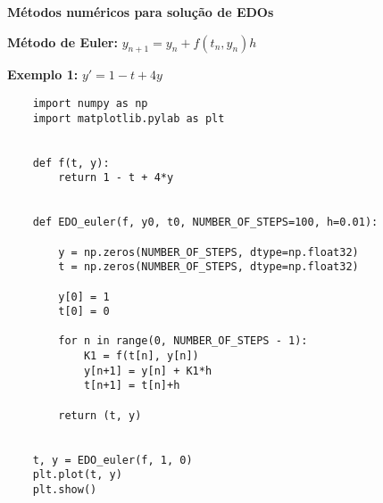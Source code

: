 \documentclass[a4paper,12pt]{article}
\begin{document}
 


\begin{center}
    \textbf{Métodos numéricos para solução de EDOs}
\end{center}

\begin{center}
    \textbf{Método de Euler:} $y_{n+1} = y_n + f(t_n,y_n)h$
\end{center}


\textbf{Exemplo 1:} $y' = 1 - t + 4y$

\begin{lstlisting}
    import numpy as np
    import matplotlib.pylab as plt
    
    
    def f(t, y):
        return 1 - t + 4*y
    
    
    def EDO_euler(f, y0, t0, NUMBER_OF_STEPS=100, h=0.01):
    
        y = np.zeros(NUMBER_OF_STEPS, dtype=np.float32)
        t = np.zeros(NUMBER_OF_STEPS, dtype=np.float32)
    
        y[0] = 1
        t[0] = 0
    
        for n in range(0, NUMBER_OF_STEPS - 1):
            K1 = f(t[n], y[n])
            y[n+1] = y[n] + K1*h  
            t[n+1] = t[n]+h  
    
        return (t, y)
    
    
    t, y = EDO_euler(f, 1, 0) 
    plt.plot(t, y)
    plt.show()

\end{lstlisting}
\end{document}
